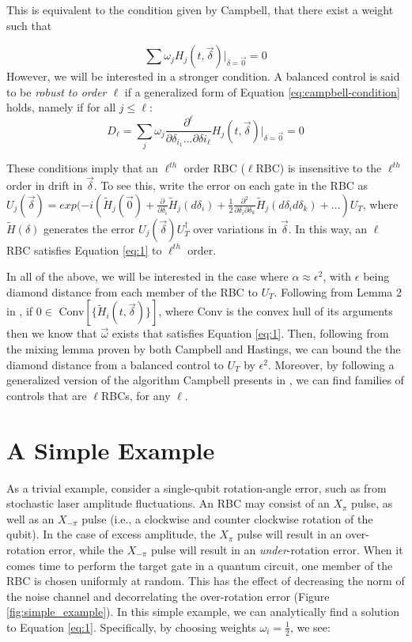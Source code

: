 \documentclass[aps,nofootinbib,pra,notitlepage,twocolumn]{revtex4-1}
\begin{document}
This is equivalent to the condition given by Campbell\cite{Campbell2017}, that there exist a weight such that

\begin{equation}\label{eq:campbell-condition}
\sum \omega_j H_j(t, \vec{\delta})|_{\delta=\vec{0}} = 0
\end{equation}
However, we will be interested in a stronger condition. A balanced control is said to be \textit{robust to order $\ell$} if a generalized form of Equation \ref{eq:campbell-condition} holds, namely if for all $j \leq \ell$:
\begin{equation}\label{eq:RBC}
D_\ell = \sum_j \omega_j \frac{\partial^{\ell}}{\partial\delta_{i_1}...\partial\delta{i_\ell}}H_j(t,\vec{\delta})|_{\delta=\vec{0}}  = 0
\end{equation}

These conditions imply that an $\ell^{th}$ order RBC ($\ell$RBC) is insensitive to the $\ell^{th}$ order in drift in $\vec{\delta}$. To see this, write the error on each gate in the RBC as $U_j(\vec{\delta}) = exp(-i(\tilde{H}_j(\vec{0}) + \frac{\partial}{\partial\delta_i}\tilde{H}_j(d\delta_i) +  \frac{1}{2}\frac{\partial^2}{\partial\delta_i\partial\delta_k} \tilde{H}_j(d\delta_i d\delta_k) + ...)U_T$, where $\tilde{H}(\delta)$ generates the error $U_j(\vec{\delta})U_T^{\dagger}$ over variations in $\vec{\delta}$. In this way, an $\ell$RBC satisfies Equation \ref{eq:1} to $\ell^{th}$ order.

In all of the above, we will be interested in the case where $\alpha \approx \epsilon^2$, with $\epsilon$ being diamond distance from each member of the RBC to $U_T$. Following from Lemma 2 in \cite{Campbell2017}, if $0\in $ Conv$[\{\tilde{H}_i(t, \vec{\delta})\}]$, where Conv is the convex hull of its arguments then we know that $\vec{\omega}$ exists that satisfies Equation \ref{eq:1}. Then, following from the mixing lemma proven by both Campbell and Hastings\cite{1612.01011}, we can bound the the diamond distance from a balanced control to $U_T$ by $\epsilon^2$. Moreover, by following a generalized version of the algorithm Campbell presents in \cite{Campbell2017}, we can find families of controls that are $\ell$RBCs, for any $\ell$.

\section{A Simple Example}
As a trivial example, consider a single-qubit rotation-angle error, such as from stochastic laser amplitude fluctuations. An RBC may consist of an $X_\pi$ pulse, as well as an $X_{-\pi}$ pulse (i.e., a clockwise and counter clockwise rotation of the qubit). In the case of excess amplitude, the $X_\pi$ pulse will result in an over-rotation error, while the $X_{-\pi}$ pulse will result in an \emph{under}-rotation error. When it comes time to perform the target gate in a quantum circuit, one member of the RBC is chosen uniformly at random. This has the effect of decreasing the norm of the noise channel and decorrelating the over-rotation error (Figure \ref{fig:simple_example}). In this simple example, we can analytically find a solution to Equation \ref{eq:1}. Specifically, by choosing weights $\omega_i=\frac{1}{2}$, we see:
\end{document}
